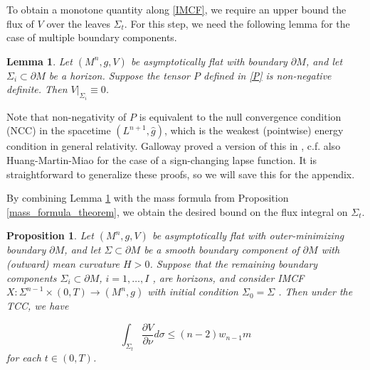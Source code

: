 \documentclass[12pt]{amsart}
\newtheorem{proposition}[theorem]{Proposition}
\newtheorem{lemma}[theorem]{Lemma}
\theoremstyle{definition}
\numberwithin{equation}{section}
\begin{document}
To obtain a monotone quantity along \eqref{IMCF}, we require an upper bound the flux of $V$ over the leaves $\Sigma_{t}$. For this step, we need the following lemma for the case of multiple boundary components.

\begin{lemma} \label{horizon}
Let $(M^{n},g,V)$ be asymptotically flat with boundary $\partial M$, and let $\Sigma_{i} \subset \partial M$ be a horizon. Suppose the tensor $P$ defined in \eqref{P} is non-negative definite. Then $V|_{\Sigma_{i}} \equiv 0$.
\end{lemma}
Note that non-negativity of $P$ is equivalent to the null convergence condition (NCC) in the spacetime $(L^{n+1},\widehat{g})$, which is the weakest (pointwise) energy condition in general relativity. Galloway proved a version of this in \cite{G93}, c.f. also Huang-Martin-Miao \cite{HMM17} for the case of a sign-changing lapse function. It is straightforward to generalize these proofs, so we will save this for the appendix.

By combining Lemma \ref{horizon} with the mass formula from Proposition \ref{mass_formula_theorem}, we obtain the desired bound on the flux integral on $\Sigma_{t}$.
\begin{proposition} \label{imcf_mass}
Let $(M^{n},g,V)$ be asymptotically flat with outer-minimizing boundary $\partial M$, and let $\Sigma \subset \partial M$ be a smooth boundary component of $\partial M$ with (outward) mean curvature $H > 0$. Suppose that the remaining boundary components $\Sigma_{i} \subset \partial M$, $i =1, \dots, I$ , are horizons, and consider IMCF $X: \Sigma^{n-1} \times (0,T) \rightarrow (M^{n},g)$ with initial condition $\Sigma_{0}=\Sigma$ . Then under the TCC, we have

\begin{equation} \label{mass_bound}
    \int_{\Sigma_{t}} \frac{\partial V}{\partial \nu} d\sigma \leq (n-2) w_{n-1} m
\end{equation}
for each $t \in (0,T)$.
\end{proposition}
\end{document}

